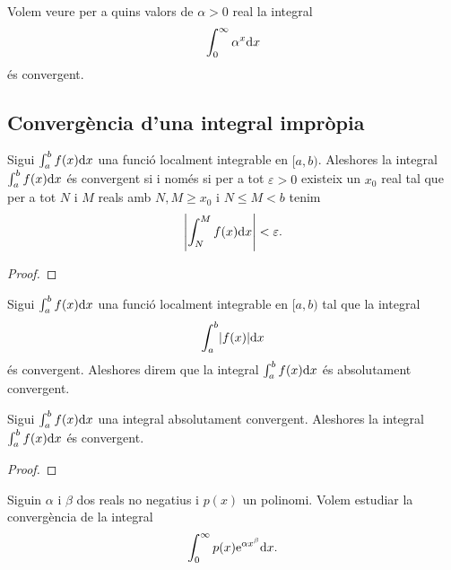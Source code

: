 \documentclass[../Apunts.tex]{subfiles}
\begin{document}
	\begin{example}
		\label{ex:criteri de la integral per integrals impròpies}
		Volem veure per a quins valors de \(\alpha>0\) real la integral
		\begin{equation}
			\label{ex:criteri de la integral per integrals impròpies:eq1}
			\int_{0}^{\infty}\alpha^{x}\mathrm{d} x
		\end{equation}
		és convergent.
		\begin{solution}
		\end{solution}
	\end{example}
	\subsection{Convergència d'una integral impròpia}
	\begin{theorem}
		\label{thm:Condició de Cauchy per integrals impròpies}
		Sigui \(\int_{a}^{b}f(x)\mathrm{d} x\) una funció localment integrable en \([a,b)\). Aleshores la integral \(\int_{a}^{b}f(x)\mathrm{d} x\) és convergent si i només si per a tot \(\varepsilon>0\) existeix un \(x_{0}\) real tal que per a tot \(N\) i \(M\) reals amb \(N,M\geq x_{0}\) i \(N\leq M<b\) tenim
		\[\abs{\int_{N}^{M}f(x)\diff x}<\varepsilon.\]
		\begin{proof}
		\end{proof}
	\end{theorem}
	\begin{definition}
		\label{def:convergència absoluta d'una integral impròpia}
		Sigui \(\int_{a}^{b}f(x)\mathrm{d} x\) una funció localment integrable en \([a,b)\) tal que la integral
		\[\int_{a}^{b}\abs{f(x)}\diff x\]
		és convergent. Aleshores direm que la integral \(\int_{a}^{b}f(x)\mathrm{d} x\) és absolutament convergent.
	\end{definition}
	\begin{proposition}
		Sigui \(\int_{a}^{b}f(x)\mathrm{d} x\) una integral absolutament convergent. Aleshores la integral \(\int_{a}^{b}f(x)\mathrm{d} x\) és convergent.
		\begin{proof}
		\end{proof}
	\end{proposition}
	\begin{example}
		\label{ex:convèrgencia absoluta d'una integral impròpia amb un polinomi i una exponencial}
		Siguin \(\alpha\) i \(\beta\) dos reals no negatius i \(p(x)\) un polinomi.
		Volem estudiar la convergència de la integral
		\[\int_{0}^{\infty}p(x)\mathrm{e}^{\alpha x^{\beta}}\mathrm{d} x.\]
		\begin{solution}
		\end{solution}
	\end{example}
\end{document}
